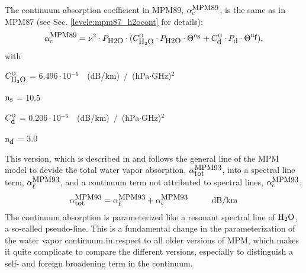{
\label{levele:mpm89_h2ocont}
The continuum absorption coefficient in MPM89, $\alpha^{\mbox{\rm \small MPM89}}_{\rm c}$, 
is the same as in MPM87 (see Sec. \ref{levele:mpm87_h2ocont} for 
details):
\begin{equation} 
  \label{eq:mpm89:cont}
  \alpha^{\mbox{\rm \small MPM89}}_{\rm c} = \nu^2 \cdot P_{\mbox{\rm \small H2O}} \cdot 
                (C^{\mbox{\rm o}}_{\mbox{\rm \small H}_{2}\mbox{\rm \small O}} \cdot P_{\mbox{\rm \small H2O}} \cdot \Theta^{{\rm n}_{\mbox{\rm \small s}}} + 
                 C^{\mbox{\rm o}}_{\mbox{\rm \small d}} \cdot P_{\mbox{\rm \small d}}  \cdot \Theta^{{\rm n}_{\mbox{\rm \small f}}}),
\end{equation}
with
\begin{description}
\item{$C^{\mbox{\rm o}}_{\mbox{\rm \small H}_{2}\mbox{\rm \small O}}$}   =  6.496\,$\cdot$\,10$^{-6}$~~(dB/km)~/~(hPa$\cdot$GHz)$^2$
\item{${\rm n}_{\mbox{\rm \small s}}$}    = 10.5
\item{$C^{\mbox{\rm o}}_{\mbox{\rm \small d}}$}   =  0.206\,$\cdot$\,10$^{-6}$~~(dB/km)~/~(hPa$\cdot$GHz)$^2$
\item{${\rm n}_{\mbox{\rm \small d}}$}    =  3.0
\end{description}





\label{leveld:mpm93}
This version, which is described in \cite{liebeetal:93} and 
follows the general line of the MPM model to devide the total 
water vapor absorption, $\alpha^{\mbox{\rm \small MPM93}}_{\mbox{\small tot}}$, into a spectral line 
term, $\alpha^{\mbox{\rm \small MPM93}}_{\mbox{\small $\ell$}}$, and a continuum term not attributed to 
spectral lines, $\alpha^{\mbox{\rm \small MPM93}}_{\rm c}$:
\begin{equation}
  \label{eq:mpm93_abs}
  \alphampmntot = \alphampmnl + \alphampmnc\hspace*{10mm}\mbox{dB/km}
\end{equation}
The continuum absorption is parameterized like a
resonant spectral line of $\mbox{H}_2\mbox{O}$, a so-called pseudo-line. This is a 
fundamental change in the parameterization of the water vapor
continuum in respect to all older versions of MPM, which makes it 
quite complicate to compare the different versions, especially to 
distinguish a self- and foreign broadening term in the continuum.



}
